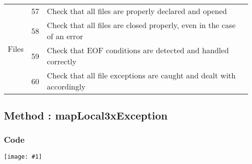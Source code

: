 \documentclass[11pt, a4paper,titlepage]{article}
\newcommand{\image}[1]{
	\begin{center}
		\noindent \texttt{[image: \#1]}
	\end{center}
	}
\begin{document}
\begin{tabularx}{\textwidth}{| X | l | X |}
	\multirow{4}{*}{Files}			 	& \label{itm:57} 57 &  
										Check that all files are properly declared and opened
										\\	\cline{2-3}
										& \label{itm:58} 58 &  
										Check that all files are closed properly, even in the case of an error
										\\	\cline{2-3}
										& \label{itm:59} 59 &  
										Check that EOF conditions are detected and handled correctly
										\\	\cline{2-3}	
										& \label{itm:60} 60 &  
										Check that all file exceptions are caught and dealt with accordingly
										\\   \hline	
										

										\end{tabularx}
\newpage
\subsection{Method : mapLocal3xException }
\subsubsection{Code}
\image{code_1.png}
\newpage
\end{document}
